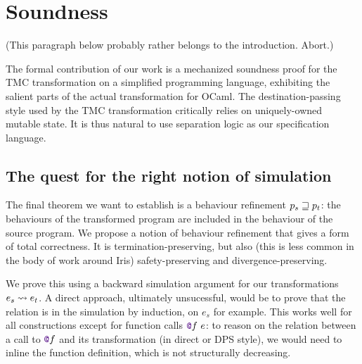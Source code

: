 \section{Soundness}
\label{sec:soundness}

(This paragraph below probably rather belongs to the introduction. Abort.)

The formal contribution of our work is a mechanized soundness proof for the TMC transformation on a simplified programming language, exhibiting the salient parts of the actual transformation for OCaml.
%
The destination-passing style used by the TMC transformation critically relies on uniquely-owned mutable state.
%
It is thus natural to use separation logic as our specification language.

\subsection{The quest for the right notion of simulation}

The final theorem we want to establish is a behaviour refinement $p_s \sqsupseteq p_t$: the behaviours of the transformed program are included in the behaviour of the source program.
%
We propose a notion of behaviour refinement that gives a form of total correctness.
%
It is termination-preserving, but also (this is less common in the body of work around Iris) safety-preserving and divergence-preserving.

We prove this using a backward simulation argument for our transformations $e_s \rightsquigarrow e_t$.
%
A direct approach, ultimately unsucessful, would be to prove that the relation is in the simulation by induction, on $e_s$ for example.
%
This works well for all constructions except for function calls $\lambdCall{\lambdFunc{f}}{e}$: to reason on the relation between a call to $\lambdFunc{f}$ and its transformation (in direct or DPS style), we would need to inline the function definition, which is not structurally decreasing.

